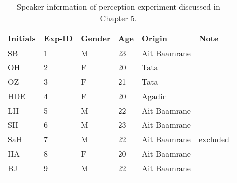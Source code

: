 \begin{table}
\caption{Speaker information of perception experiment discussed in Chapter 5.}
\label{Table A3}
\begin{tabular}{llllll}
\lsptoprule
\textbf{Initials}                        & \textbf{Exp-ID} & \textbf{Gender} & \textbf{Age} & \textbf{Origin}       & \textbf{Note}     \\
\midrule
SB                              & 1      & M      & 23  & Ait Baamrane &          \\
OH                              & 2      & F      & 20  & Tata         &          \\
OZ                              & 3      & F      & 21  & Tata         &          \\
HDE                             & 4      & F      & 20  & Agadir       &          \\
LH                              & 5      & M      & 22  & Ait Baamrane &          \\
SH                              & 6      & M      & 23  & Ait Baamrane &          \\
SaH                             & 7      & M      & 22  & Ait Baamrane & excluded \\
HA                              & 8      & F      & 20  & Ait Baamrane &          \\
BJ                              & 9      & M      & 22  & Ait Baamrane &         \\
\lspbottomrule
\end{tabular}
\end{table}